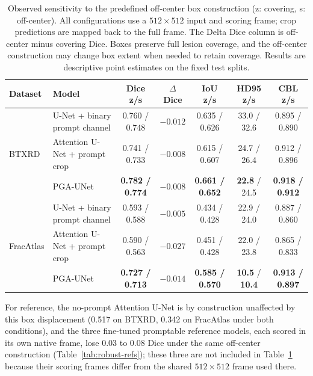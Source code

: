 \begin{table}[t]
\caption{Observed sensitivity to the predefined off-center box construction (z: covering, s: off-center). All configurations use a $512\times512$ input and scoring frame; crop predictions are mapped back to the full frame. The Delta Dice column is off-center minus covering Dice. Boxes preserve full lesion coverage, and the off-center construction may change box extent when needed to retain coverage. Results are descriptive point estimates on the fixed test splits.}
\label{tab:robust}
\centering
\begin{tabular}{llccccc}
\toprule
Dataset & Model & Dice z/s & $\Delta$Dice & IoU z/s & HD95 z/s & CBL z/s \\
\midrule
\multirow{3}{*}{BTXRD}
& U-Net + binary prompt channel & 0.760 / 0.748 & $-0.012$ & 0.635 / 0.626 & 33.0 / 32.6 & 0.895 / 0.890 \\
& Attention U-Net + prompt crop & 0.741 / 0.733 & $-0.008$ & 0.615 / 0.607 & 24.7 / 26.4 & 0.912 / 0.896 \\
& PGA-UNet & \textbf{0.782 / 0.774} & $-0.008$ & \textbf{0.661 / 0.652} & \textbf{22.8} / 24.5 & \textbf{0.918 / 0.912} \\
\midrule
\multirow{3}{*}{FracAtlas}
& U-Net + binary prompt channel & 0.593 / 0.588 & $\mathbf{-0.005}$ & 0.434 / 0.428 & 22.9 / 24.0 & 0.887 / 0.860 \\
& Attention U-Net + prompt crop & 0.590 / 0.563 & $-0.027$ & 0.451 / 0.428 & 22.0 / 23.8 & 0.865 / 0.833 \\
& PGA-UNet & \textbf{0.727 / 0.713} & $-0.014$ & \textbf{0.585 / 0.570} & \textbf{10.5} / \textbf{10.4} & \textbf{0.913 / 0.897} \\
\bottomrule
\end{tabular}
\end{table}

For reference, the no-prompt Attention U-Net is by construction unaffected by this box displacement (0.517 on BTXRD, 0.342 on FracAtlas under both conditions), and the three fine-tuned promptable reference models, each scored in its own native frame, lose 0.03 to 0.08 Dice under the same off-center construction (Table~\ref{tab:robust-refs}); these three are not included in Table~\ref{tab:robust} because their scoring frames differ from the shared $512\times512$ frame used there.

